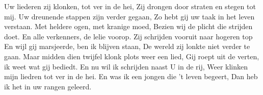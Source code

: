 \beginverse*
Uw liederen zij klonken, tot ver in de hei,
Zij drongen door straten en stegen tot mij.
Uw dreunende stappen zijn verder gegaan,
Zo hebt gij uw taak in het leven verstaan.
\endverse
\beginchorus
Met heldere ogen, met kranige moed,
Bezien wij de plicht die strijden doet.
En alle verkenners, de lelie voorop.
Zij schrijden vooruit naar hogeren top
\endchorus
\beginverse*
En wijl gij marsjeerde, ben ik blijven staan,
De wereld zij lonkte niet verder te gaan.
Maar midden dien twijfel klonk plots weer een lied,
Gij roept uit de verten, ik weet wat gij bediedt.
\endverse
\beginverse*
En nu wil ik schrijden naast U in de rij,
Weer klinken mijn liedren tot ver in de hei.
En was ik een jongen die ’t leven begeert,
Dan heb ik het in uw rangen geleerd.
\endverse
\endsong